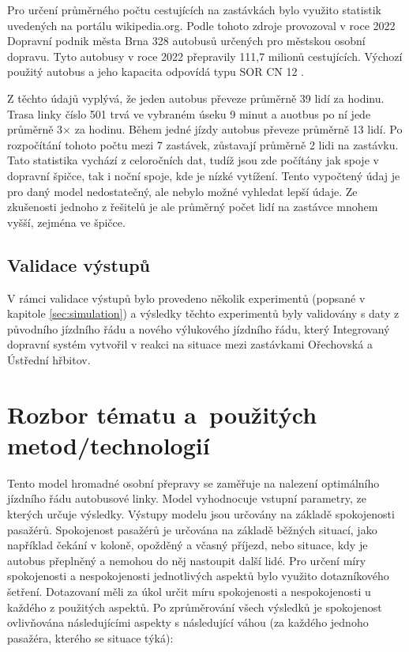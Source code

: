\documentclass[a4paper]{article}
\begin{document}
            Pro určení průměrného počtu cestujících na zastávkách bylo využito statistik \cite{Pocet_cestujicich} uvedených na portálu wikipedia.org. Podle tohoto zdroje provozoval v roce 2022 Dopravní podnik města Brna 328 autobusů určených pro městskou osobní dopravu. Tyto autobusy v roce 2022 přepravily 111,7 milionů cestujících. Výchozí použitý autobus a jeho kapacita odpovídá typu SOR CN 12 \cite{PSOR_CN_12}.
            
            Z těchto údajů vyplývá, že jeden autobus převeze průměrně 39 lidí za hodinu. Trasa linky číslo 501 trvá ve vybraném úseku 9 minut a auotbus po ní jede průměrně 3$\times$ za hodinu. Během jedné jízdy autobus převeze průměrně 13 lidí. 
            Po rozpočítání tohoto počtu mezi 7 zastávek, zůstavají průměrně 2 lidi na zastávku.
            Tato statistika vychází z celoročních dat, tudíž jsou zde počítány jak spoje v dopravní špičce, tak i noční spoje, kde je nízké vytížení. Tento vypočtený údaj je pro daný model nedostatečný, ale nebylo možné vyhledat lepší údaje. Ze zkušenosti jednoho z řešitelů je ale průměrný počet lidí na zastávce mnohem vyšší, zejména ve špičce.

        \subsection{Validace výstupů}
        \label{subsec:validation}
        V rámci validace výstupů bylo provedeno několik experimentů (popsané v kapitole \ref{sec:simulation}) a výsledky těchto experimentů byly validovány s daty z původního jízdního řádu a nového výlukového jízdního řádu, který Integrovaný dopravní systém vytvořil v reakci na situace mezi zastávkami Ořechovská a Ústřední hřbitov. 
	
\newpage
    \section{Rozbor tématu a~použitých metod/technologií}
    \label{sec:methods}
   		Tento model hromadné osobní přepravy se zaměřuje na nalezení optimálního jízdního řádu autobusové linky. Model vyhodnocuje vstupní parametry, ze kterých určuje výsledky. Výstupy modelu jsou určovány na základě spokojenosti pasažérů. Spokojenost pasažérů je určována na základě běžných situací, jako například čekání v koloně, opožděný a včasný příjezd, nebo situace, kdy je autobus přeplněný a nemohou do něj nastoupit další lidé. Pro určení míry spokojenosti a nespokojenosti jednotlivých aspektů bylo využito dotazníkového šetření. Dotazovaní měli za úkol určit míru spokojenosti a nespokojenosti u každého z použitých aspektů. Po zprůměrování všech výsledků je spokojenost ovlivňována následujícími aspekty s následující váhou (za každého jednoho pasažéra, kterého se situace týká): 
   		
\end{document}
